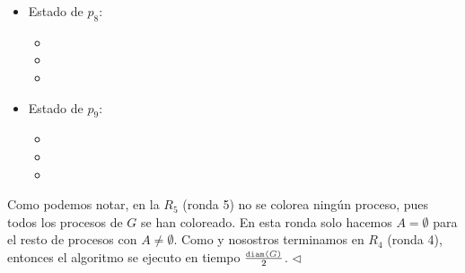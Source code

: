 \begin{multicols}{2}
\begin{itemize}
\begin{itemize}
      \item {}
      \end{itemize}

\item Estado de $p_8$:
      \begin{itemize}
      \item {}
      
      \item {}
      
      \item {}
      \end{itemize}

\item Estado de $p_9$:
      \begin{itemize}
      \item {}
      
      \item {}
      
      \item {}
      \end{itemize}

\end{itemize}
\end{multicols}

Como podemos notar, en la $R_5$ (ronda 5) no se colorea ningún proceso,
pues todos los procesos de $G$ se han coloreado. En esta ronda solo hacemos
$A = \emptyset$ para el resto de procesos con $A \not= \emptyset$. Como
 y nosostros terminamos en $R_4$ (ronda 4), entonces
el algoritmo se ejecuto en tiempo $\frac{\textnormal{\code{diam($G$)}}}{2}$.
\hfill $\lhd$
\newline

